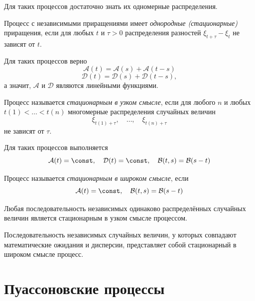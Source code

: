 \begin{remark}
    Для таких процессов достаточно знать их одномерные распределения.
\end{remark}

\begin{definition}
    Процесс с независимыми приращениями имеет \emph{однородные (стационарные)} приращения, если
    для любых $ t $ и $ \tau > 0 $ распределения разностей $ \xi_{t + \tau} - \xi_{t} $ не
    зависят от $ t $.
\end{definition}

\begin{remark}
    Для таких процессов верно
    $$ \mathcal A(t) = \mathcal A(s) + \mathcal A(t - s) $$
    $$ \mathcal D(t) = \mathcal D(s) + \mathcal D(t - s), $$
    а значит, $ \mathcal A $ и $ \mathcal D $ являются линейными функциями.
\end{remark}

\begin{definition}
    Процесс называется \emph{стационарным в узком смысле}, если для любого $ n $ и любых
    $ t(1) < \dots < t(n) $ многомерные распределения случайных величин
    $$ \xi_{t(1) + \tau}, \quad \dots, \quad \xi_{t(n) + \tau} $$
    не зависят от $ \tau $.
\end{definition}

\begin{remark}
    Для таких процессов выполняется
    $$ \mathcal A(t) = \const, \quad \mathcal D(t) = \const, \quad
    \mathcal B(t, s) = \mathcal B(s - t) $$
\end{remark}

\begin{definition}
    Процесс называется \emph{стационарным в широком смысле}, если
    $$ \mathcal A(t) = \const, \quad \mathcal B(t, s) = \mathcal B(s - t) $$
\end{definition}

\begin{exmpls}
\item Любая последовательность независимых одинаково распределённых случайных величин
    является стационарным в узком смысле процессом.
\item Последовательность независимых случайных величин, у которых совпадают математические
    ожидания и дисперсии, представляет собой стационарный в широком смысле процесс.
\end{exmpls}

\section{Пуассоновские процессы}

